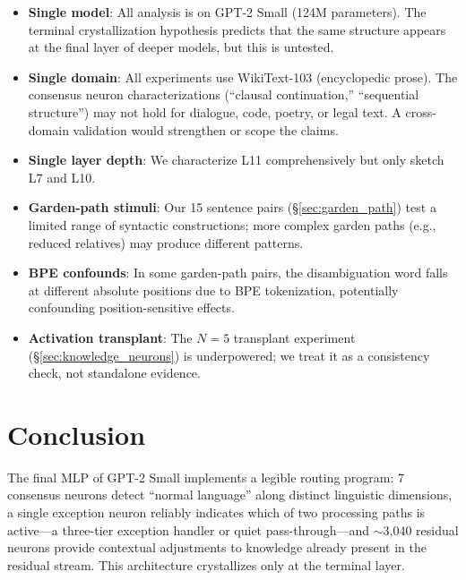 \documentclass{article}
\begin{document}
\begin{itemize}
\item \textbf{Single model}: All analysis is on GPT-2 Small (124M parameters).
The terminal crystallization hypothesis predicts that the same structure
appears at the final layer of deeper models, but this is untested.
\item \textbf{Single domain}: All experiments use WikiText-103 (encyclopedic
prose). The consensus neuron characterizations (``clausal continuation,''
``sequential structure'') may not hold for dialogue, code, poetry, or
legal text. A cross-domain validation would strengthen or scope the claims.
\item \textbf{Single layer depth}: We characterize L11 comprehensively but only
sketch L7 and L10.
\item \textbf{Garden-path stimuli}: Our 15 sentence pairs
(\S\ref{sec:garden_path}) test a limited range of syntactic constructions;
more complex garden paths (e.g., reduced relatives) may produce different
patterns.
\item \textbf{BPE confounds}: In some garden-path pairs, the
disambiguation word falls at different absolute positions due to BPE
tokenization, potentially confounding position-sensitive effects.
\item \textbf{Activation transplant}: The $N = 5$ transplant experiment
(\S\ref{sec:knowledge_neurons}) is underpowered; we treat it as a
consistency check, not standalone evidence.
\end{itemize}

\section{Conclusion}

The final MLP of GPT-2 Small implements a legible routing program:
7 consensus neurons detect ``normal language'' along distinct linguistic
dimensions, a single exception neuron reliably indicates which of
two processing paths is active---a three-tier exception handler or quiet
pass-through---and $\sim$3{,}040 residual neurons provide contextual adjustments
to knowledge already present in the residual stream.
This architecture crystallizes only at the terminal layer.
\end{document}
